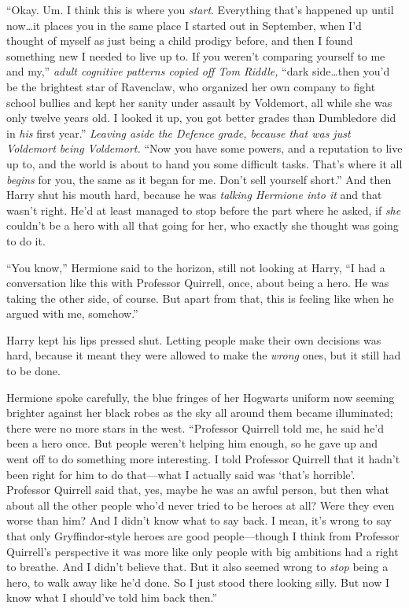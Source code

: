 “Okay. Um. I think this is where you \emph{start}. Everything that’s happened up until now…it places you in the same place I started out in September, when I’d thought of myself as just being a child prodigy before, and then I found something new I needed to live up to. If you weren’t comparing yourself to me and my,” \emph{adult cognitive patterns copied off Tom Riddle,} “dark side…then you’d be the brightest star of Ravenclaw, who organized her own company to fight school bullies and kept her sanity under assault by Voldemort, all while she was only twelve years old. I looked it up, you got better grades than Dumbledore did in \emph{his} first year.” \emph{Leaving aside the Defence grade, because that was just Voldemort being Voldemort.} “Now you have some powers, and a reputation to live up to, and the world is about to hand you some difficult tasks. That’s where it all \emph{begins} for you, the same as it began for me. Don’t sell yourself short.” And then Harry shut his mouth hard, because he was \emph{talking Hermione into it} and that wasn’t right. He’d at least managed to stop before the part where he asked, if \emph{she} couldn’t be a hero with all that going for her, who exactly she thought was going to do it.

“You know,” Hermione said to the horizon, still not looking at Harry, “I had a conversation like this with Professor Quirrell, once, about being a hero. He was taking the other side, of course. But apart from that, this is feeling like when he argued with me, somehow.”

Harry kept his lips pressed shut. Letting people make their own decisions was hard, because it meant they were allowed to make the \emph{wrong} ones, but it still had to be done.

Hermione spoke carefully, the blue fringes of her Hogwarts uniform now seeming brighter against her black robes as the sky all around them became illuminated; there were no more stars in the west. “Professor Quirrell told me, he said he’d been a hero once. But people weren’t helping him enough, so he gave up and went off to do something more interesting. I told Professor Quirrell that it hadn’t been right for him to do that—what I actually said was ‘that’s horrible’. Professor Quirrell said that, yes, maybe he was an awful person, but then what about all the other people who’d never tried to be heroes at all? Were they even worse than him? And I didn’t know what to say back. I mean, it’s wrong to say that only Gryffindor-style heroes are good people—though I think from Professor Quirrell’s perspective it was more like only people with big ambitions had a right to breathe. And I didn’t believe that. But it also seemed wrong to \emph{stop} being a hero, to walk away like he’d done. So I just stood there looking silly. But now I know what I should’ve told him back then.”

